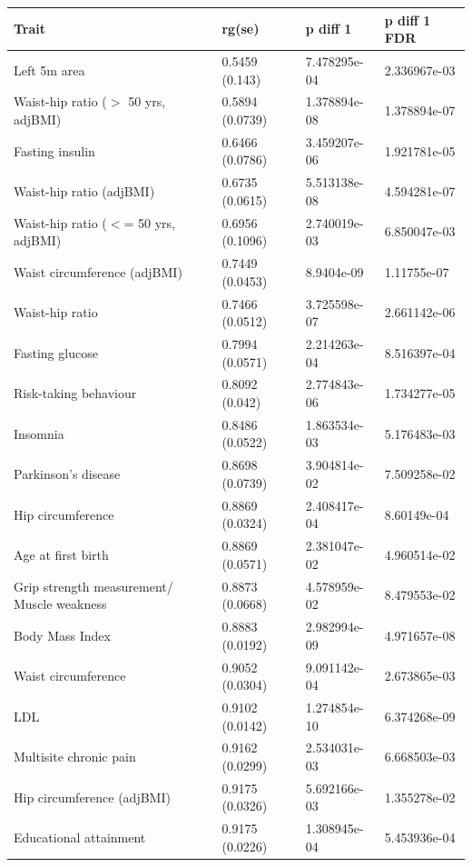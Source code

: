 \begin{table}[ht]
\centering
\begin{tabular}{llll}
  \hline
Trait & rg(se) & p diff 1 & p diff 1 FDR \\ 
  \hline
Left 5m area & 0.5459 (0.143) & 7.478295e-04 & 2.336967e-03 \\ 
  Waist-hip ratio ($>$ 50 yrs, adjBMI) & 0.5894 (0.0739) & 1.378894e-08 & 1.378894e-07 \\ 
  Fasting insulin & 0.6466 (0.0786) & 3.459207e-06 & 1.921781e-05 \\ 
  Waist-hip ratio (adjBMI) & 0.6735 (0.0615) & 5.513138e-08 & 4.594281e-07 \\ 
  Waist-hip ratio ($<$= 50 yrs, adjBMI) & 0.6956 (0.1096) & 2.740019e-03 & 6.850047e-03 \\ 
  Waist circumference (adjBMI) & 0.7449 (0.0453) & 8.9404e-09 & 1.11755e-07 \\ 
  Waist-hip ratio  & 0.7466 (0.0512) & 3.725598e-07 & 2.661142e-06 \\ 
  Fasting glucose & 0.7994 (0.0571) & 2.214263e-04 & 8.516397e-04 \\ 
  Risk-taking behaviour & 0.8092 (0.042) & 2.774843e-06 & 1.734277e-05 \\ 
  Insomnia & 0.8486 (0.0522) & 1.863534e-03 & 5.176483e-03 \\ 
  Parkinson's disease & 0.8698 (0.0739) & 3.904814e-02 & 7.509258e-02 \\ 
  Hip circumference  & 0.8869 (0.0324) & 2.408417e-04 & 8.60149e-04 \\ 
  Age at first birth  & 0.8869 (0.0571) & 2.381047e-02 & 4.960514e-02 \\ 
  Grip strength measurement/ Muscle weakness & 0.8873 (0.0668) & 4.578959e-02 & 8.479553e-02 \\ 
  Body Mass Index  & 0.8883 (0.0192) & 2.982994e-09 & 4.971657e-08 \\ 
  Waist circumference  & 0.9052 (0.0304) & 9.091142e-04 & 2.673865e-03 \\ 
  LDL & 0.9102 (0.0142) & 1.274854e-10 & 6.374268e-09 \\ 
  Multisite chronic pain & 0.9162 (0.0299) & 2.534031e-03 & 6.668503e-03 \\ 
  Hip circumference (adjBMI) & 0.9175 (0.0326) & 5.692166e-03 & 1.355278e-02 \\ 
  Educational attainment & 0.9175 (0.0226) & 1.308945e-04 & 5.453936e-04 \\ 

\end{tabular}
\end{table}
